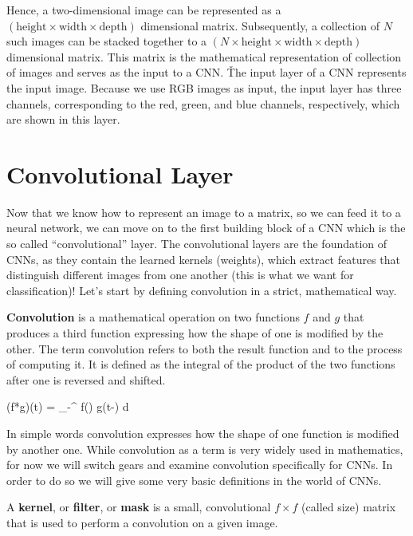 
Hence, a two-dimensional image can be represented as a $(\text{height} \times \text{width} \times
\text{depth})$ dimensional matrix. Subsequently, a collection of $N$ such images can be stacked together to a $(N
\times \text{height} \times \text{width} \times \text{depth})$ dimensional matrix. This matrix is the
mathematical representation of collection of images and serves as the input to a CNN. \v

The input layer of a CNN represents the input image. Because we use RGB images as input, the input layer has three 
channels, corresponding to the red, green, and blue channels, respectively, which are shown in this layer.

\section{Convolutional Layer}

Now that we know how to represent an image to a matrix, so we can feed it to a neural network, we can move on to the 
first building block of a CNN which is the so called ``convolutional'' layer. The convolutional layers are the 
foundation of CNNs, as they contain the learned kernels (weights), which extract features that distinguish different 
images from one another (this is what we want for classification)! Let's start by defining convolution in a strict,
mathematical way.

\bd[Convolution]
\textbf{Convolution} is a mathematical operation on two functions $f$ and $g$ that produces a third function 
expressing how the shape of one is modified by the other. The term convolution refers to both the result function and
to the process of computing it. It is defined as the integral of the product of the two functions after one is 
reversed and shifted. 

\bse 
(f*g)(t) = \int_{-\infty }^{\infty } f(\tau) g(t-\tau ) d\tau 
\ese 
\ed

In simple words convolution expresses how the shape of one function is modified by another one. While convolution as
a term is very widely used in mathematics, for now we will switch gears and examine convolution specifically for CNNs.
In order to do so we will give some very basic definitions in the world of CNNs.

A \textbf{kernel}, or \textbf{filter}, or \textbf{mask} is a small, convolutional $f \times f$ (called size) matrix 
that is used to perform a convolution on a given image. 
\ed


